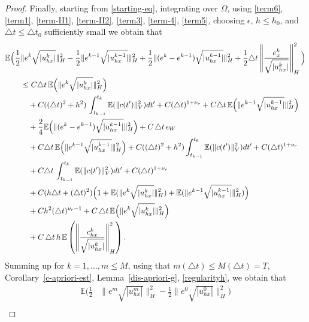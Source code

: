 \documentclass[a4paper,10pt]{article}
\numberwithin{equation}{section}
\begin{document}
\begin{proof}
Finally, starting from \eqref{starting-eq}, integrating over $\Omega$, using \eqref{term6}, \eqref{term1}, \eqref{term-II1}, \eqref{term-II2}, \eqref{term3}, \eqref{term-4}, \eqref{term5},
choosing $\epsilon$, $h \leq h_{0}$, and $\triangle t \leq \triangle t_{0}$ sufficiently small we obtain that
\begin{align*} 
\mathbb{E} \Big( \frac{1}{2} &\| e^{k}\sqrt{|u^{k}_{hx}|} \|^{2}_{H} - \frac{1}{2} \| e^{k-1}\sqrt{|u^{k-1}_{hx}|}\|^{2}_{H} + \frac{1}{2} \|(e^{k} -e^{k-1})\sqrt{|u^{k-1}_{hx}|}\|^{2}_{H}
+\frac{1}{2}\triangle t \left \| \frac{e_{x}^{k}}{\sqrt{|u^{k}_{hx}|}} \right \|^{2}_{H} \Big) \notag \\
& \leq C \triangle t \,\mathbb{E} \Big{(} \| e^{k}\sqrt{|u^{k}_{hx}|} \|^{2}_{H} \Big{)} \\
& \quad + C ( (\triangle t)^{2} + h^{2}) \,\int_{t_{k-1}}^{t_{k}} \mathbb{E} ( \|c(t')\|^{2}_{V} ) dt' + C(\triangle t)^{1+\nu_{r}} + C \triangle t \, \mathbb{E} \Big{(} \| e^{k-1}\sqrt{|u^{k-1}_{hx}|}\|_{H}^{2} \Big{)}
\\ 
& \quad + 
\frac{2}{4} \mathbb{E}\Big(\|( e^{k}-e^{k-1}) \sqrt{|u^{k-1}_{hx}|}\|_{H}^{2} \Big) + 
C \, \triangle t \, \epsilon_{W} \\
& \quad 
+ C \triangle t \, \mathbb{E} \Big{(} \| e^{k-1}\sqrt{|u^{k-1}_{hx}|}\|_{H}^{2} \Big{)} + C ((\triangle t)^{2}+h^{2}) \int_{t_{k-1}}^{t_{k}} \mathbb{E}( \| c(t')\|^{2}_{V}) dt'
 + C(\triangle t)^{1+\nu_{r}} 
\\
& \quad + C \triangle t \,\int_{t_{k-1}}^{t_{k}} \mathbb{E} ( \|c(t')\|^{2}_{V} ) dt' + C (\triangle t)^{1+\nu_{r}} \\
& \quad
+ C (h \triangle t + (\triangle t)^{2}) \Big{(} 1 + \mathbb{E}(\| e^{k}\sqrt{|u^{k}_{hx}|} \|^{2}_{H}) + \mathbb{E}(\| e^{k-1}\sqrt{|u^{k-1}_{hx}|} \|^{2}_{H}) \Big{)}
\\
& \quad + C h^{2} (\triangle t)^{\nu_{r}-1} + C \, \triangle t \, \mathbb{E} \Big{(} \| e^{k} \sqrt{|u^{k}_{hx}|} \|^{2}_{H} \Big{)} \\
& \quad + C \, \triangle t \, h \, \mathbb{E} \left (\left \| \frac{c^{k}_{hx}}{\sqrt{|u^{k}_{hx}| } } \right \| ^{2}_{H} \right).
\end{align*}
Summing up for $k=1, \ldots, m \leq M$, using that $m (\triangle t) \leq M (\triangle t) =T$, Corollary~\ref{c-apriori-est}, Lemma~\ref{dis-apriori-g}, \eqref{regularityh},
we obtain that
\begin{align*}
\mathbb{E} \Big( \frac{1}{2 } &\| e^{m}\sqrt{|u^{m}_{hx}|} \|^{2}_{H} - \frac{1}{2 } \| e^{0}\sqrt{|u^{0}_{hx}|}\|^{2}_{H} \Big) \\

\end{align*}
\end{proof}
\end{document}
